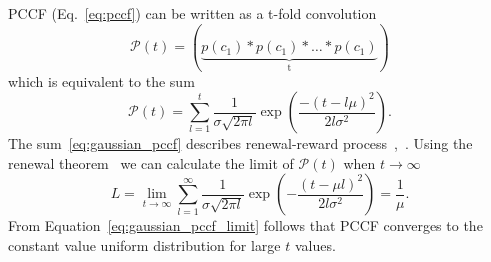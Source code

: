 PCCF (Eq.~\ref{eq:pccf})
can be written as a t-fold convolution
\begin{equation}
\mathcal{P}(t) =
(
\underbrace{
    p(c_1) \ast p(c_1) \ast \dots  \ast p(c_1)
}_\text{t}
)
\end{equation}
%
%
which is equivalent to the sum
\begin{equation}
    \mathcal{P}(t) = \sum_{l=1}^{t} \frac{1}{\sigma \sqrt{2 \pi l}} \exp \left(\frac{-(t - l \mu)^2}{2 l \sigma^2} \right)
    \label{eq:gaussian_pccf}.
\end{equation}
The sum~\ref{eq:gaussian_pccf} describes renewal-reward process~\cite{cox1962renewal},~\cite{feller1968introduction}.
Using the renewal theorem~\cite{cox1962renewal}
we can calculate the limit of $\mathcal{P}(t)$ when $t \to \infty$
\begin{equation}
L = \lim_{t \to \infty} \sum_{l=1}^{\infty} \frac{1}{\sigma \sqrt{2 \pi l}} \exp\left(-\frac{(t- \mu l)^2}{2 l \sigma^2} \right) = \frac{1}{\mu}.
\label{eq:gaussian_pccf_limit}
\end{equation}
From Equation~\ref{eq:gaussian_pccf_limit} follows that PCCF converges to the constant value uniform distribution for large $t$ values.
